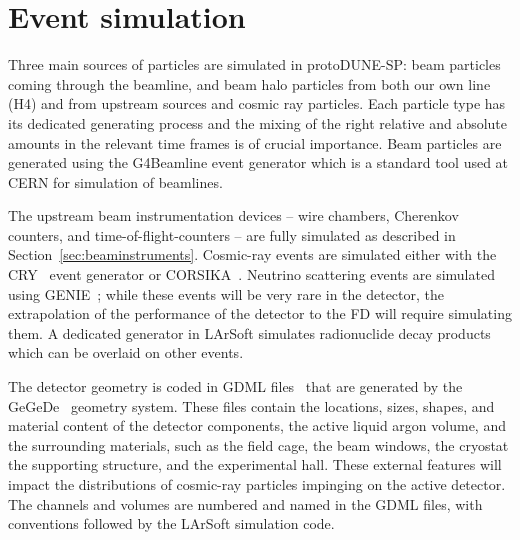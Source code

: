 \section{Event simulation}
\label{sec:larsoftsim}

Three main sources of particles are simulated in protoDUNE-SP: beam particles coming through the beamline, and beam halo particles from both our own line (H4) and from upstream sources and cosmic ray particles. Each particle type has its dedicated generating process and the mixing of the right relative and absolute amounts in the relevant time frames is of crucial importance.
 Beam particles are generated using the G4Beamline event generator which is a standard tool used at CERN for simulation of beamlines.

The upstream beam instrumentation devices -- wire chambers, Cherenkov
counters, and time-of-flight-counters -- are fully simulated as described in
Section~\ref{sec:beaminstruments}. Cosmic-ray
events are simulated either with the CRY~\cite{cry, cry2} event generator or
CORSIKA~\cite{Heck:1998vt}.  Neutrino scattering events are simulated
using GENIE~\cite{Andreopoulos:2009rq}; while these %
events will be very
rare in the detector, the extrapolation of the performance of
the \pdsp
detector to the FD will require simulating them. %
A dedicated generator in LArSoft simulates
radionuclide decay products which can be overlaid on other events.

The detector geometry is coded in GDML files~\cite{Agostinelli:2002hh} that are
generated by the GeGeDe~\cite{gegede} 
geometry system.  These files
contain the locations, sizes, shapes, and material content of the
detector components, the active liquid argon volume, and the
surrounding materials, such as the field cage, the beam windows, the
cryostat the supporting structure, and the experimental hall.  These
external features will impact the distributions of cosmic-ray
particles impinging on the active detector.  The channels and volumes
are numbered and named in the GDML files, with conventions followed by
the LArSoft simulation code.

